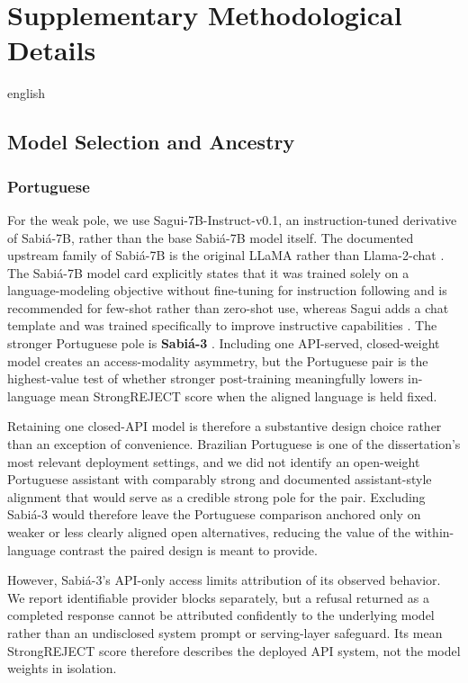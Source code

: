 \chapter{Supplementary Methodological Details}
\label{app:method-details}
\begin{otherlanguage*}{english}
\section{Model Selection and Ancestry}
\subsection{Portuguese}

For the weak pole, we use Sagui-7B-Instruct-v0.1, an instruction-tuned derivative of Sabiá-7B, rather than the base Sabiá-7B model itself. The documented upstream family of Sabiá-7B is the original LLaMA rather than Llama-2-chat \cite{maritacaAISabia7b2023}. The Sabiá-7B model card explicitly states that it was trained solely on a language-modeling objective without fine-tuning for instruction following and is recommended for few-shot rather than zero-shot use, whereas Sagui adds a chat template and was trained specifically to improve instructive capabilities \cite{maritacaAISabia7b2023,OliveiraJLT2024Sagui7BInstruct01}. The stronger Portuguese pole is \textbf{Sabiá-3} \cite{abonizioSabia32024}. Including one API-served, closed-weight model creates an access-modality asymmetry, but the Portuguese pair is the highest-value test of whether stronger post-training meaningfully lowers in-language mean StrongREJECT score when the aligned language is held fixed.

Retaining one closed-API model is therefore a substantive design choice rather than an exception of convenience. Brazilian Portuguese is one of the dissertation's most relevant deployment settings, and we did not identify an open-weight Portuguese assistant with comparably strong and documented assistant-style alignment that would serve as a credible strong pole for the pair. Excluding Sabiá-3 would therefore leave the Portuguese comparison anchored only on weaker or less clearly aligned open alternatives, reducing the value of the within-language contrast the paired design is meant to provide.

However, Sabiá-3's API-only access limits attribution of its observed behavior. We report identifiable provider blocks separately, but a refusal returned as a completed response cannot be attributed confidently to the underlying model rather than an undisclosed system prompt or serving-layer safeguard. Its mean StrongREJECT score therefore describes the deployed API system, not the model weights in isolation.


\end{otherlanguage*}
